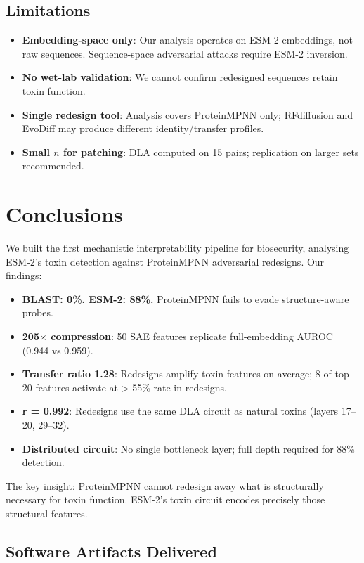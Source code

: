 \documentclass[11pt,a4paper]{article}
\begin{document}
\subsection{Limitations}
\begin{itemize}
    \item \textbf{Embedding-space only}: Our analysis operates on ESM-2 embeddings, not raw sequences. Sequence-space adversarial attacks require ESM-2 inversion.
    \item \textbf{No wet-lab validation}: We cannot confirm redesigned sequences retain toxin function.
    \item \textbf{Single redesign tool}: Analysis covers ProteinMPNN only; RFdiffusion and EvoDiff may produce different identity/transfer profiles.
    \item \textbf{Small $n$ for patching}: DLA computed on 15 pairs; replication on larger sets recommended.
\end{itemize}

\section{Conclusions}

We built the first mechanistic interpretability pipeline for biosecurity, analysing ESM-2's toxin detection against ProteinMPNN adversarial redesigns. Our findings:

\begin{itemize}
    \item \textbf{BLAST: 0\%. ESM-2: 88\%.} ProteinMPNN fails to evade structure-aware probes.
    \item \textbf{205$\times$ compression}: 50 SAE features replicate full-embedding AUROC (0.944 vs 0.959).
    \item \textbf{Transfer ratio 1.28}: Redesigns amplify toxin features on average; 8 of top-20 features activate at > 55\% rate in redesigns.
    \item \textbf{r = 0.992}: Redesigns use the same DLA circuit as natural toxins (layers 17--20, 29--32).
    \item \textbf{Distributed circuit}: No single bottleneck layer; full depth required for 88\% detection.
\end{itemize}

The key insight: ProteinMPNN cannot redesign away what is structurally necessary for toxin function. ESM-2's toxin circuit encodes precisely those structural features.

\subsection{Software Artifacts Delivered}
\end{document}
